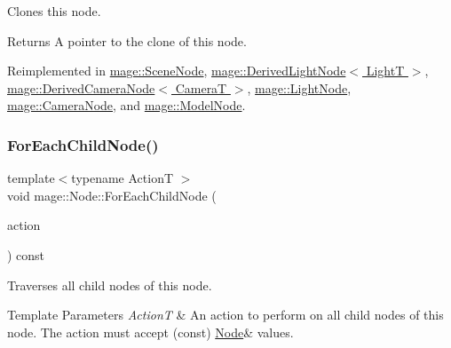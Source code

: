 Clones this node.

\begin{DoxyReturn}{Returns}
A pointer to the clone of this node. 
\end{DoxyReturn}


Reimplemented in \hyperlink{classmage_1_1_scene_node_a42d0d53ab804d38ebd584d2de6490eeb}{mage\+::\+Scene\+Node}, \hyperlink{classmage_1_1_derived_light_node_acf8858989780bf45a45c55a7c5564314}{mage\+::\+Derived\+Light\+Node$<$ Light\+T $>$}, \hyperlink{classmage_1_1_derived_camera_node_aa965751029ebd6b41d3805b499a8304e}{mage\+::\+Derived\+Camera\+Node$<$ Camera\+T $>$}, \hyperlink{classmage_1_1_light_node_aea97601d0a4b8073a1c655ca334af242}{mage\+::\+Light\+Node}, \hyperlink{classmage_1_1_camera_node_a002d3a2b41cda270a26ca5d8f3a17f55}{mage\+::\+Camera\+Node}, and \hyperlink{classmage_1_1_model_node_a34146201083015276b38240af307417f}{mage\+::\+Model\+Node}.

\hypertarget{classmage_1_1_node_afedb523a462952ec29aed7504d0a71d4}{}\label{classmage_1_1_node_afedb523a462952ec29aed7504d0a71d4} 
\subsubsection{\texorpdfstring{For\+Each\+Child\+Node()}{ForEachChildNode()}}
{\footnotesize\ttfamily template$<$typename ActionT $>$ \\
void mage\+::\+Node\+::\+For\+Each\+Child\+Node (\begin{DoxyParamCaption}\item[{ActionT}]{action }\end{DoxyParamCaption}) const}

Traverses all child nodes of this node.


\begin{DoxyTemplParams}{Template Parameters}
{\em ActionT} & An action to perform on all child nodes of this node. The action must accept ({\ttfamily const}) {\ttfamily \hyperlink{classmage_1_1_node}{Node}\&} values. \\
\hline
\end{DoxyTemplParams}
\hypertarget{classmage_1_1_node_a86668c371e1452204b52f2896cbb16fd}{}\label{classmage_1_1_node_a86668c371e1452204b52f2896cbb16fd} 

